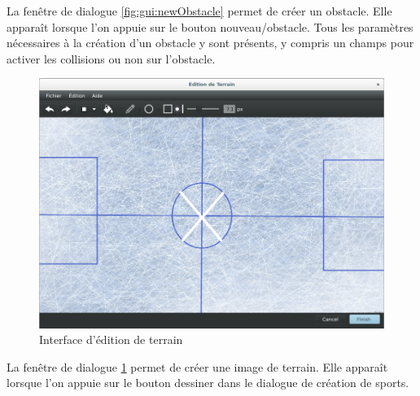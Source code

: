 La fenêtre de dialogue \ref{fig:gui:newObstacle} permet de créer un obstacle.
Elle apparaît lorsque l'on appuie sur le bouton nouveau/obstacle.
Tous les paramètres nécessaires à la création d'un obstacle y sont présents, y compris un champs pour activer les collisions ou non sur l'obstacle.

\begin{figure}[htpb]
    \centering
    \includegraphics[scale=0.35]{fig/gui/gui_edit_field.png}
    \caption{Interface d'édition de terrain}
    \label{fig:gui:terrain}
\end{figure}

La fenêtre de dialogue \ref{fig:gui:terrain} permet de créer une image de terrain.
Elle apparaît lorsque l'on appuie sur le bouton dessiner dans le dialogue de création de sports.


